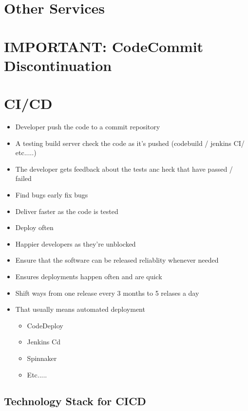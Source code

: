 \section{Other Services}


\section{IMPORTANT: CodeCommit Discontinuation}


\section{CI/CD}
\begin{itemize}
    \item Developer push the code to a commit repository
    \item A testing build server check the code as it's pushed (codebuild / jenkins CI/ etc.....)
    \item The developer gets feedback about the tests anc heck that have passed / failed
    \item Find bugs early fix bugs
    \item Deliver faster as the code is tested
    \item Deploy often
    \item Happier developers as they're unblocked
\end{itemize}

\begin{itemize}
    \item Ensure that the software can be released reliablity whenever needed
    \item Ensures deployments happen often and are quick
    \item Shift ways from one release every 3 months to 5 relases a day
    \item That usually means automated deployment
    \begin{itemize}
        \item CodeDeploy
        \item Jenkins Cd
        \item Spinnaker
        \item Etc.....
    \end{itemize}
\end{itemize}

\subsection{Technology Stack for CICD}

